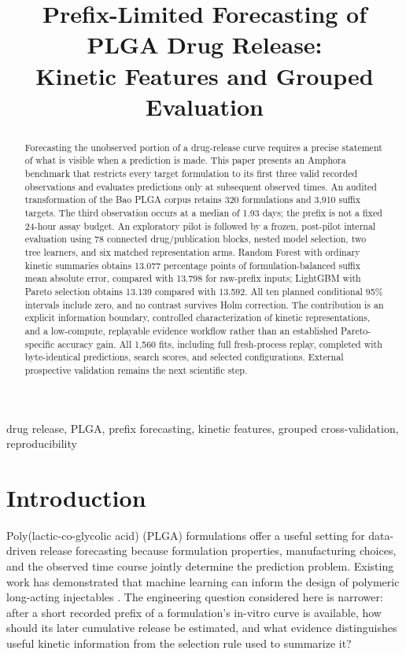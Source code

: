 \documentclass[conference,letterpaper]{IEEEtran}
\title{Prefix-Limited Forecasting of PLGA Drug Release:\\Kinetic Features and Grouped Evaluation}
\author{\IEEEauthorblockN{Jepson Taylor}\IEEEauthorblockA{Amphora technical white paper draft\\18 October 2026}}
\begin{document}
\maketitle
\begin{abstract}
Forecasting the unobserved portion of a drug-release curve requires a precise statement of what is visible when a prediction is made. This paper presents an Amphora benchmark that restricts every target formulation to its first three valid recorded observations and evaluates predictions only at subsequent observed times. An audited transformation of the Bao PLGA corpus retains 320 formulations and 3,910 suffix targets. The third observation occurs at a median of 1.93 days; the prefix is not a fixed 24-hour assay budget. An exploratory pilot is followed by a frozen, post-pilot internal evaluation using 78 connected drug/publication blocks, nested model selection, two tree learners, and six matched representation arms. Random Forest with ordinary kinetic summaries obtains 13.077 percentage points of formulation-balanced suffix mean absolute error, compared with 13.798 for raw-prefix inputs; LightGBM with Pareto selection obtains 13.139 compared with 13.592. All ten planned conditional 95\% intervals include zero, and no contrast survives Holm correction. The contribution is an explicit information boundary, controlled characterization of kinetic representations, and a low-compute, replayable evidence workflow rather than an established Pareto-specific accuracy gain. All 1,560 fits, including full fresh-process replay, completed with byte-identical predictions, search scores, and selected configurations. External prospective validation remains the next scientific step.
\end{abstract}
\begin{IEEEkeywords}
drug release, PLGA, prefix forecasting, kinetic features, grouped cross-validation, reproducibility
\end{IEEEkeywords}

\section{Introduction}
Poly(lactic-co-glycolic acid) (PLGA) formulations offer a useful setting for data-driven release forecasting because formulation properties, manufacturing choices, and the observed time course jointly determine the prediction problem. Existing work has demonstrated that machine learning can inform the design of polymeric long-acting injectables \cite{bannigan2023}. The engineering question considered here is narrower: after a short recorded prefix of a formulation's in-vitro curve is available, how should its later cumulative release be estimated, and what evidence distinguishes useful kinetic information from the selection rule used to summarize it?
\end{document}
